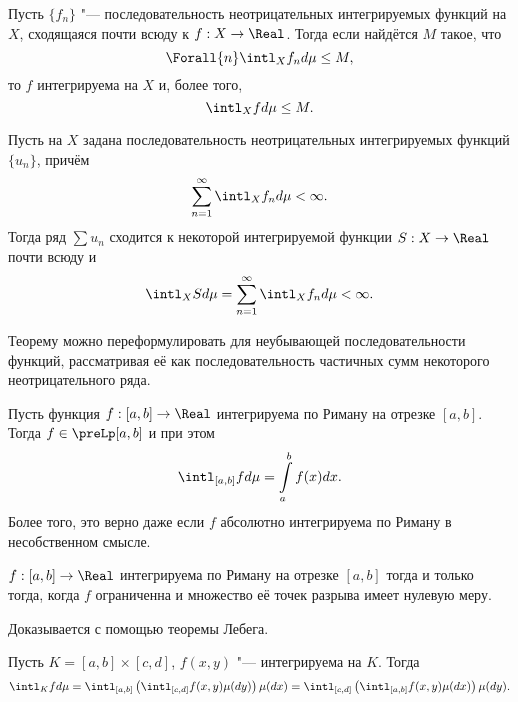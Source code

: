 \documentclass[main]{subfiles}
\begin{document}
\begin{theorem*}
  Пусть \( \{ f_n \} \) "--- последовательность
  неотрицательных интегрируемых функций на \( X \),
  сходящаяся почти всюду к \( f : X \to \Real \).
  Тогда если найдётся \( M \) такое, что
  \[
    \Forall{n} \intl_X f_n d \mu \le M,
  \]
  то \( f \) интегрируема на \( X \)
  и, более того,
  \[
    \intl_X f d \mu \le M.
  \]
\end{theorem*}

\begin{theorem*}
  Пусть на \( X \) задана последовательность
  неотрицательных интегрируемых функций \( \{ u_n \} \),
  причём
  \[
    \sum_{n=1}^\infty \intl_X f_n d \mu < \infty.
  \]
  Тогда ряд \( \sum u_n \) сходится к некоторой
  интегрируемой функции \( S : X \to \Real \)
  почти всюду и
  \[
    \intl_X S d \mu = \sum_{n=1}^\infty \intl_X f_n d \mu < \infty.
  \]
\end{theorem*}
\begin{remark}
  Теорему можно переформулировать
  для неубывающей последовательности функций,
  рассматривая её как последовательность
  частичных сумм некоторого неотрицательного ряда.
\end{remark}

\begin{theorem*}
  Пусть функция \( f : [a, b] \to \Real \)
  интегрируема по Риману на отрезке \( [a, b] \).
  Тогда \( f \in \preLp[a, b] \) и при этом
  \[
    \intl_{[a,b]} f d \mu = \int\limits_a^b f(x) dx.
  \]
  Более того, это верно даже если
  \( f \) абсолютно интегрируема по Риману в несобственном смысле.
\end{theorem*}

\begin{theorem*}
  \( f : [a, b] \to \Real \) интегрируема по Риману
  на отрезке \( [a, b] \) тогда и только тогда, когда
  \( f \) ограниченна и множество её точек разрыва
  имеет нулевую меру.
\end{theorem*}

\begin{remark}
  Доказывается с помощью теоремы Лебега.
\end{remark}

\begin{theorem*}[Фубини]
  Пусть \( K = [a, b] \times [c, d] \),
  \( f(x, y) \) "--- интегрируема на \( K \).
  Тогда
  \[
    \intl_K f d \mu
    = \intl_{[a, b]} \left( \intl_{[c, d]} f(x, y) \mu(dy) \right) \mu(dx)
    = \intl_{[c, d]} \left( \intl_{[a, b]} f(x, y) \mu(dx) \right) \mu(dy).
  \]
\end{theorem*}
\end{document}
